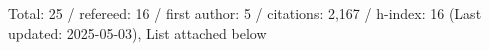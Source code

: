 Total: 25 / refereed: 16 / first author: 5 / citations: 2,167 / h-index: 16 (Last updated: 2025-05-03), List attached below